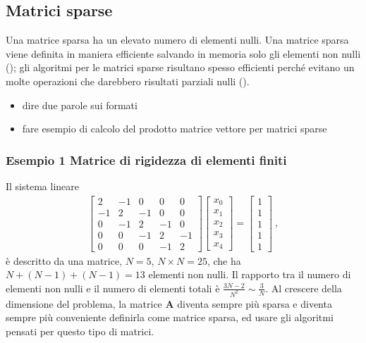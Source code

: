 \documentclass[letterpaper,10pt,english]{jupyterBook}
\begin{document}
\subsection{Matrici sparse}
\label{\detokenize{ch/numerics/linear:matrici-sparse}}
\sphinxAtStartPar
Una matrice sparsa ha un elevato numero di elementi nulli. Una matrice sparsa viene definita in maniera efficiente salvando in memoria solo gli elementi non nulli (); gli algoritmi per le matrici sparse risultano spesso efficienti perché evitano un molte operazioni che darebbero risultati parziali nulli ().
\begin{itemize}
\item {} 
\sphinxAtStartPar
{} dire due parole sui formati

\item {} 
\sphinxAtStartPar
{} fare esempio di calcolo del prodotto matrice vettore per matrici sparse

\end{itemize}


\subsubsection{Esempio 1 \sphinxhyphen{} Matrice di rigidezza di elementi finiti}
\label{\detokenize{ch/numerics/linear:esempio-1-matrice-di-rigidezza-di-elementi-finiti}}
\sphinxAtStartPar
Il sistema lineare
\begin{equation*}
\begin{split}\begin{bmatrix} 2 & -1 & 0 & 0 & 0 \\ -1 & 2 & -1 & 0 & 0 \\ 0 & -1 & 2 & -1 & 0 \\ 0 & 0 & -1 & 2 & -1 \\ 0 & 0 & 0 & -1  & 2 \end{bmatrix} \begin{bmatrix} x_0 \\ x_1 \\ x_2 \\ x_3 \\ x_4 \end{bmatrix} = \begin{bmatrix} 1 \\ 1 \\ 1 \\ 1 \\ 1 \end{bmatrix} \ ,\end{split}
\end{equation*}
\sphinxAtStartPar
è descritto da una matrice, \(N=5\), \(N \times N = 25\), che ha \(N+(N-1)+(N-1) = 13\) elementi non nulli. Il rapporto tra il numero di elementi non nulli e il numero di elementi totali è \(\frac{3N-2}{N^2} \sim \frac{3}{N}\). Al crescere della dimensione del problema, la matrice \(\mathbf{A}\) diventa sempre più sparsa e diventa sempre più conveniente definirla come matrice sparsa, ed usare gli algoritmi pensati per questo tipo di matrici.
\end{document}
